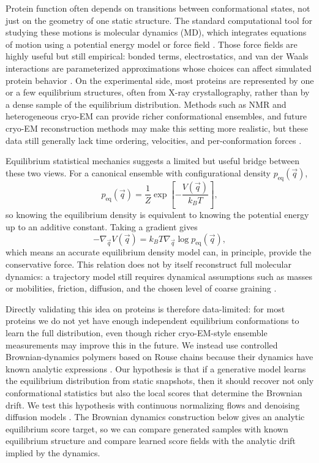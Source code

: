 \documentclass[reprint,amsmath,amssymb,aps,pra,10pt]{revtex4-2}
\begin{document}
Protein function often depends on transitions between conformational states, not just on the geometry of one static structure.
The standard computational tool for studying these motions is molecular dynamics (MD), which integrates equations of motion using a potential energy model or force field \cite{hollingsworth2018}.
Those force fields are highly useful but still empirical: bonded terms, electrostatics, and van der Waals interactions are parameterized approximations whose choices can affect simulated protein behavior \cite{huang2013,maier2015}.
On the experimental side, most proteins are represented by one or a few equilibrium structures, often from X-ray crystallography, rather than by a dense sample of the equilibrium distribution.
Methods such as NMR and heterogeneous cryo-EM can provide richer conformational ensembles, and future cryo-EM reconstruction methods may make this setting more realistic, but these data still generally lack time ordering, velocities, and per-conformation forces \cite{zhong2021}.

Equilibrium statistical mechanics suggests a limited but useful bridge between these two views.
For a canonical ensemble with configurational density $p_{\mathrm{eq}}(\vec{q})$,
\begin{equation}
    p_{\mathrm{eq}}(\vec{q})
    =
    \frac{1}{Z}
    \exp
    \left[
        -\frac{V(\vec{q})}{k_B T}
    \right],
\end{equation}
so knowing the equilibrium density is equivalent to knowing the potential energy up to an additive constant.
Taking a gradient gives
\begin{equation}
    -\nabla_{\vec{q}}V(\vec{q})
    =
    k_B T\nabla_{\vec{q}}\log p_{\mathrm{eq}}(\vec{q}),
\end{equation}
which means an accurate equilibrium density model can, in principle, provide the conservative force.
This relation does not by itself reconstruct full molecular dynamics: a trajectory model still requires dynamical assumptions such as masses or mobilities, friction, diffusion, and the chosen level of coarse graining \cite{noe2019,arts2023}.

Directly validating this idea on proteins is therefore data-limited: for most proteins we do not yet have enough independent equilibrium conformations to learn the full distribution, even though richer cryo-EM-style ensemble measurements may improve this in the future.
We instead use controlled Brownian-dynamics polymers based on Rouse chains because their dynamics have known analytic expressions \cite{rouse1953}.
Our hypothesis is that if a generative model learns the equilibrium distribution from static snapshots, then it should recover not only conformational statistics but also the local scores that determine the Brownian drift.
We test this hypothesis with continuous normalizing flows and denoising diffusion models \cite{grathwohl2018,arts2023}.
The Brownian dynamics construction below gives an analytic equilibrium score target, so we can compare generated samples with known equilibrium structure and compare learned score fields with the analytic drift implied by the dynamics.
\end{document}
